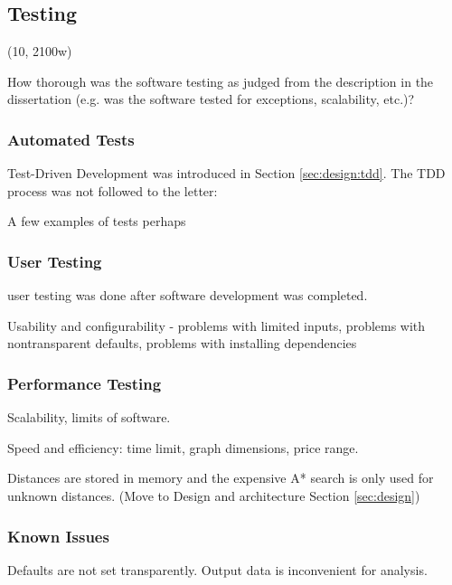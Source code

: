 \subsection{Testing}
\label{sec:implementation:testing}

(10, 2100w)

How thorough was the software testing as judged from the description in the
dissertation (e.g. was the software tested for exceptions, scalability, etc.)?


\subsubsection{Automated Tests}

Test-Driven Development was introduced in Section \ref{sec:design:tdd}. The TDD
process was not followed to the letter: 

A few examples of tests perhaps


\subsubsection{User Testing}

user testing was done after software development
was completed. 

Usability and configurability - problems with limited inputs, problems with
nontransparent defaults, problems with installing dependencies


\subsubsection{Performance Testing}

Scalability, limits of software. 

Speed and efficiency: time limit, graph dimensions, price range. 

Distances are stored in memory and the expensive A* search is only used for
unknown distances. (Move to Design and architecture Section \ref{sec:design})


\subsubsection{Known Issues}

Defaults are not set transparently. Output data is inconvenient for analysis. 
